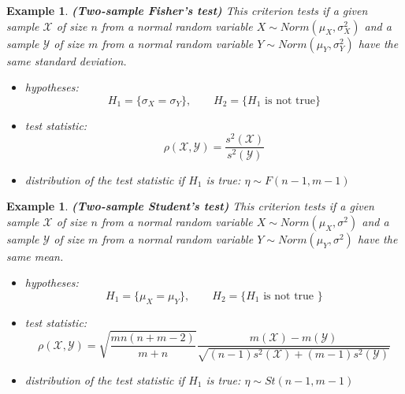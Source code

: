 \documentclass[12pt]{article}
\newtheorem{example}[theorem]{Example}
\begin{document}
\begin{example} \textbf{(Two-sample Fisher's test)} This criterion tests if a
    given sample $\mathscr{X}$ of size $n$ from a normal random variable
    $X\sim Norm(\mu_X,\sigma_X^2)$ and a sample $\mathscr{Y}$ of size $m$ from
    a normal random variable $Y\sim Norm(\mu_Y,\sigma_Y^2)$ have 
    the same standard deviation.
    \begin{itemize}
        \item hypotheses:
              $$
                  H_1=\{\sigma_X=\sigma_Y\},\quad\quad H_2
                  =\{H_1\mbox{ is not true}\}
              $$
        \item test statistic:
              $$
                  \rho(\mathscr{X},\mathscr{Y})
                  =\frac{s^2(\mathscr{X})}{s^2(\mathscr{Y})}
              $$
        \item distribution of the test statistic if $H_1$ is true:
              $\eta\sim F(n-1,m-1)$
    \end{itemize}
\end{example}

\begin{example} \textbf{(Two-sample Student's test)} This criterion tests if a
    given sample $\mathscr{X}$ of size $n$ from a normal random variable 
    $X\sim Norm(\mu_X,\sigma^2)$ and a sample $\mathscr{Y}$ of size $m$ from a 
    normal random variable $Y\sim Norm(\mu_Y,\sigma^2)$ have the same mean.
    \begin{itemize}
        \item hypotheses:
              $$
                  H_1=\{\mu_X=\mu_Y\},\quad\quad H_2=\{H_1\mbox{ is not true }\}
              $$
        \item test statistic:
              $$
                  \rho(\mathscr{X},\mathscr{Y})
                  =\sqrt{\frac{mn(n+m-2)}{m+n}}\frac{m(\mathscr{X})
                      -m(\mathscr{Y})}{\sqrt{(n-1)s^2(\mathscr{X})
                          +(m-1)s^2(\mathscr{Y})}}
              $$
        \item distribution of the test statistic if $H_1$ is true:
              $\eta\sim St(n-1,m-1)$
    \end{itemize}
\end{example}
\end{document}
